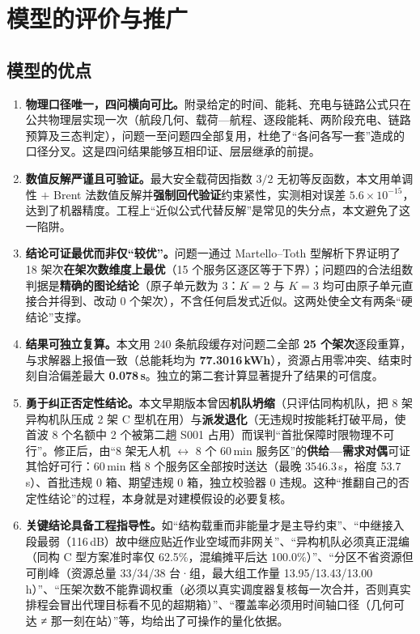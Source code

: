 \section{模型的评价与推广}

\subsection{模型的优点}

\begin{enumerate}[label=\textbf{优点 \arabic*}]
	\item \textbf{物理口径唯一，四问横向可比。}附录给定的时间、能耗、充电与链路公式只在公共物理层实现一次（航段几何、载荷—航程、逐段能耗、两阶段充电、链路预算及三态判定），问题一至问题四全部复用，杜绝了“各问各写一套”造成的口径分叉。这是四问结果能够互相印证、层层继承的前提。
	\item \textbf{数值反解严谨且可验证。}最大安全载荷因指数 $3/2$ 无初等反函数，本文用单调性 $+$ Brent 法数值反解并\textbf{强制回代验证}约束紧性，实测相对误差 $5.6\times10^{-15}$，达到了机器精度。工程上“近似公式代替反解”是常见的失分点，本文避免了这一陷阱。
	\item \textbf{结论可证最优而非仅“较优”。}问题一通过 Martello--Toth 型解析下界证明了 18 架次\textbf{在架次数维度上最优}（15 个服务区逐区等于下界）；问题四的合法组数判据是\textbf{精确的图论结论}（原子单元数为 3：$K=2$ 与 $K=3$ 均可由原子单元直接合并得到、改动 0 个架次），不含任何启发式近似。这两处使全文有两条“硬结论”支撑。
	\item \textbf{结果可独立复算。}本文用 240 条航段缓存对问题二全部 \textbf{25 个架次}逐段重算，与求解器上报值一致（总能耗均为 \textbf{77.3016\,kWh}），资源占用零冲突、结束时刻自洽偏差最大 \textbf{0.078\,s}。独立的第二套计算显著提升了结果的可信度。
	\item \textbf{勇于纠正否定性结论。}本文早期版本曾因\textbf{机队坍缩}（只评估同构机队，把 8 架异构机队压成 2 架 C 型机在用）与\textbf{派发退化}（无违规时按能耗打破平局，使首波 8 个名额中 2 个被第二趟 S001 占用）而误判“首批保障时限物理不可行”。修正后，由“8 架无人机 $\leftrightarrow$ 8 个 60\,min 服务区”的\textbf{供给—需求对偶}可证其恰好可行：60\,min 档 8 个服务区全部按时送达（最晚 3546.3\,s，裕度 53.7\,s）、首批违规 0 箱、期望违规 0 箱，独立校验器 0 违规。这种“推翻自己的否定性结论”的过程，本身就是对建模假设的必要复核。
	\item \textbf{关键结论具备工程指导性。}如“结构载重而非能量才是主导约束”、“中继接入段最弱（116\,dB）故中继应贴近作业空域而非网关”、“异构机队必须真正混编（同构 C 型方案准时率仅 62.5\%，混编摊平后达 100.0\%）”、“分区不省资源但可削峰（资源总量 33/34/38 台·组，最大组工作量 13.95/13.43/13.00\,h）”、“压架次数不能靠调权重（必须以真实调度器复核每一次合并，否则真实排程会冒出代理目标看不见的超期箱）”、“覆盖率必须用时间轴口径（几何可达 ≠ 那一刻在站）”等，均给出了可操作的量化依据。
\end{enumerate}

